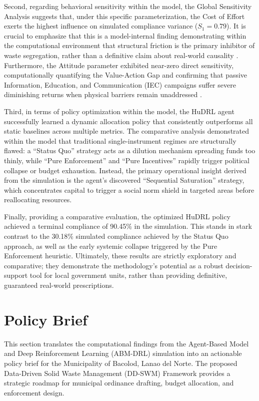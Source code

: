 Second, regarding behavioral sensitivity within the model, the Global Sensitivity Analysis suggests that, under this specific parameterization, the Cost of Effort exerts the highest influence on simulated compliance variance ($S_1 = 0.79$). It is crucial to emphasize that this is a model-internal finding demonstrating within the computational environment that structural friction is the primary inhibitor of waste segregation, rather than a definitive claim about real-world causality \citep{Yazawa2025}. Furthermore, the Attitude parameter exhibited near-zero direct sensitivity, computationally quantifying the Value-Action Gap and confirming that passive Information, Education, and Communication (IEC) campaigns suffer severe diminishing returns when physical barriers remain unaddressed \citep{Zhao2022}.

Third, in terms of policy optimization within the model, the HuDRL agent successfully learned a dynamic allocation policy that consistently outperforms all static baselines across multiple metrics. The comparative analysis demonstrated within the model that traditional single-instrument regimes are structurally flawed: a ``Status Quo'' strategy acts as a dilution mechanism spreading funds too thinly, while ``Pure Enforcement'' and ``Pure Incentives'' rapidly trigger political collapse or budget exhaustion. Instead, the primary operational insight derived from the simulation is the agent's discovered ``Sequential Saturation'' strategy, which concentrates capital to trigger a social norm shield in targeted areas before reallocating resources.

Finally, providing a comparative evaluation, the optimized HuDRL policy achieved a terminal compliance of 90.45\% in the simulation. This stands in stark contrast to the 30.18\% simulated compliance achieved by the Status Quo approach, as well as the early systemic collapse triggered by the Pure Enforcement heuristic. Ultimately, these results are strictly exploratory and comparative; they demonstrate the methodology's potential as a robust decision-support tool for local government units, rather than providing definitive, guaranteed real-world prescriptions.

\section{Policy Brief}
\label{sec:policy_brief}

This section translates the computational findings from the Agent-Based Model and Deep Reinforcement Learning (ABM-DRL) simulation into an actionable policy brief for the Municipality of Bacolod, Lanao del Norte. The proposed Data-Driven Solid Waste Management (DD-SWM) Framework provides a strategic roadmap for municipal ordinance drafting, budget allocation, and enforcement design.

